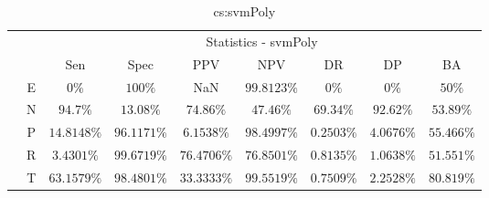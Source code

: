 \begin{table}[!ht]
	\centering
	\begin{tabular}{|c|c|c|c|c|c|c|c|c|}
		\cline{3-9}
		\multicolumn{2}{c|}{} & \multicolumn{7}{c|}{Statistics - svmPoly} \\ \cline{3-9}
		\multicolumn{2}{c|}{} & Sen & Spec & PPV & NPV & DR & DP & BA \\ \hline
		\multirow{5}{*}{\rotatebox{90}{Class}} & E & $0\%$ & $100\%$ & NaN & $99.8123\%$ & $0\%$ & $0\%$ & $50\%$ \\ \cline{2-9}
		 & N & $94.7\%$ & $13.08\%$ & $74.86\%$ & $47.46\%$ & $69.34\%$ & $92.62\%$ & $53.89\%$ \\ \cline{2-9}
		 & P & $14.8148\%$ & $96.1171\%$ & $6.1538\%$ & $98.4997\%$ & $0.2503\%$ & $4.0676\%$ & $55.466\%$ \\ \cline{2-9}
		 & R & $3.4301\%$ & $99.6719\%$ & $76.4706\%$ & $76.8501\%$ & $0.8135\%$ & $1.0638\%$ & $51.551\%$ \\ \cline{2-9}
		 & T & $63.1579\%$ & $98.4801\%$ & $33.3333\%$ & $99.5519\%$ & $0.7509\%$ & $2.2528\%$ & $80.819\%$ \\ \hline
	\end{tabular}
	\caption{cs:svmPoly}
	\label{tab:cs:svmPoly}
\end{table}
